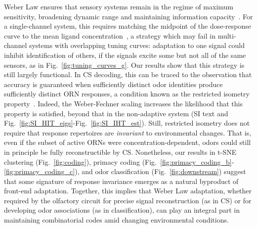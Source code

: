 \documentclass[10pt,prl,aps,showpacs,twocolumn,unsortedaddress,showkeys,linenumbers]{revtex4-1}
\begin{document}
Weber Law ensures that sensory systems remain in the regime of maximum sensitivity, broadening dynamic range and maintaining information capacity~\cite{adaptation_fairhall}.
For a single-channel system, this requires matching the midpoint of the dose-response curve to the mean ligand concentration~\cite{information_theory_adaptation}, a strategy which may fail in multi-channel systems with overlapping tuning curves: adaptation to one signal could inhibit identification of others, if the signals excite some but not all of the same sensors, as in Fig.~\ref{fig:tuning_curves_g}. 
Our results show that this strategy is still largely functional. In CS decoding, this can be traced to the observation that accuracy is guaranteed when sufficiently distinct odor identities produce sufficiently distinct ORN responses, a condition known as the restricted isometry property~\cite{CS_tao}. Indeed, the Weber-Fechner scaling increases the likelihood that this property  is satisfied, beyond that in the non-adaptive system (SI text and Fig.~\ref{fig:SI_HIT_eigs}-Fig.~\ref{fig:SI_IHT_est}). Still, restricted isometry does not require that response repertoires are \textit{invariant} to environmental changes. That is, even if the subset of active ORNs were concentration-dependent, odors could still in principle be fully reconstructible by CS.
Nonetheless, our results in t-SNE clustering (Fig.~\ref{fig:coding}), primacy coding  (Fig.~\ref{fig:primacy_coding_b}-\ref{fig:primacy_coding_c}), and odor classification (Fig.~\ref{fig:downstream}) suggest that some signature of response invariance emerges as a natural byproduct of front-end adaptation. Together, this implies that Weber Law adaptation, whether required by the olfactory circuit for precise signal reconstruction (as in CS) or for developing odor associations (as in classification), can play an integral part in maintaining combinatorial codes amid changing environmental conditions.

\end{document}
